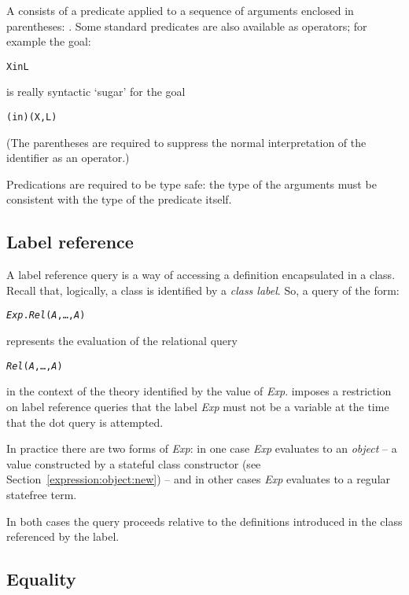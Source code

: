 A  consists of a predicate applied to a sequence of arguments enclosed in parentheses: . Some standard predicates are also available as operators; for example the goal:
\begin{alltt}
X in L
\end{alltt}
is really syntactic `sugar' for the goal
\begin{alltt}
(in)(X,L)
\end{alltt}
(The parentheses are required to suppress the normal interpretation of the identifier  as an operator.)

Predications are required to be type safe: the type of the arguments must be consistent with the type of the predicate itself.

\subsection{Label reference}
\label{query:dot}

A label reference query is a way of accessing a definition encapsulated in a class. Recall that, logically, a class is identified by a \emph{class label}. So, a query of the form:
\begin{alltt}
\emph{Exp}.\emph{Rel}(\emph{A},\ldots,\emph{A\subn})
\end{alltt}
represents the evaluation of the relational query
\begin{alltt}
\emph{Rel}(\emph{A},\ldots,\emph{A\subn})
\end{alltt}
in the context of the theory identified by the value of \emph{Exp}. \go imposes a restriction on label reference queries that the label \emph{Exp} must not be a variable at the time that the dot query is attempted.

In practice there are two forms of \emph{Exp}: in one case \emph{Exp} evaluates to an \emph{object} -- a value constructed by a stateful class constructor (see Section~\vref{expression:object:new}) -- and in other cases \emph{Exp} evaluates to a regular statefree term.

In both cases the query proceeds relative to the definitions introduced in the class referenced by the label.

\subsection{Equality}
\label{goal:equality}

